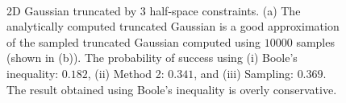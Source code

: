 \documentclass[letterpaper]{article}
\begin{document}
\linespread{1.0}
\begin{figure}[t]
\begin{center}
\hspace{10pt}
\\
\end{center}
\caption{2D Gaussian truncated by 3 half-space constraints. (a) The analytically computed truncated Gaussian is a good approximation of the sampled truncated Gaussian computed using $10000$ samples (shown in (b)). The probability of success using (i) Boole's inequality: $0.182$, (ii) Method 2: $0.341$, and (iii) Sampling: $0.369$. The result obtained using Boole's inequality is overly conservative.}
\label{fig:panel1}
\end{figure}
\end{document}

